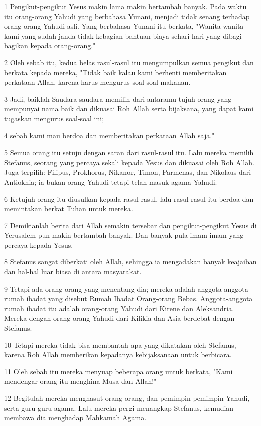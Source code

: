 \par 1 Pengikut-pengikut Yesus makin lama makin bertambah banyak. Pada waktu itu orang-orang Yahudi yang berbahasa Yunani, menjadi tidak senang terhadap orang-orang Yahudi asli. Yang berbahasa Yunani itu berkata, "Wanita-wanita kami yang sudah janda tidak kebagian bantuan biaya sehari-hari yang dibagi-bagikan kepada orang-orang."
\par 2 Oleh sebab itu, kedua belas rasul-rasul itu mengumpulkan semua pengikut dan berkata kepada mereka, "Tidak baik kalau kami berhenti memberitakan perkataan Allah, karena harus mengurus soal-soal makanan.
\par 3 Jadi, baiklah Saudara-saudara memilih dari antaramu tujuh orang yang mempunyai nama baik dan dikuasai Roh Allah serta bijaksana, yang dapat kami tugaskan mengurus soal-soal ini;
\par 4 sebab kami mau berdoa dan memberitakan perkataan Allah saja."
\par 5 Semua orang itu setuju dengan saran dari rasul-rasul itu. Lalu mereka memilih Stefanus, seorang yang percaya sekali kepada Yesus dan dikuasai oleh Roh Allah. Juga terpilih: Filipus, Prokhorus, Nikanor, Timon, Parmenas, dan Nikolaus dari Antiokhia; ia bukan orang Yahudi tetapi telah masuk agama Yahudi.
\par 6 Ketujuh orang itu diusulkan kepada rasul-rasul, lalu rasul-rasul itu berdoa dan memintakan berkat Tuhan untuk mereka.
\par 7 Demikianlah berita dari Allah semakin tersebar dan pengikut-pengikut Yesus di Yerusalem pun makin bertambah banyak. Dan banyak pula imam-imam yang percaya kepada Yesus.
\par 8 Stefanus sangat diberkati oleh Allah, sehingga ia mengadakan banyak keajaiban dan hal-hal luar biasa di antara masyarakat.
\par 9 Tetapi ada orang-orang yang menentang dia; mereka adalah anggota-anggota rumah ibadat yang disebut Rumah Ibadat Orang-orang Bebas. Anggota-anggota rumah ibadat itu adalah orang-orang Yahudi dari Kirene dan Aleksandria. Mereka dengan orang-orang Yahudi dari Kilikia dan Asia berdebat dengan Stefanus.
\par 10 Tetapi mereka tidak bisa membantah apa yang dikatakan oleh Stefanus, karena Roh Allah memberikan kepadanya kebijaksanaan untuk berbicara.
\par 11 Oleh sebab itu mereka menyuap beberapa orang untuk berkata, "Kami mendengar orang itu menghina Musa dan Allah!"
\par 12 Begitulah mereka menghasut orang-orang, dan pemimpin-pemimpin Yahudi, serta guru-guru agama. Lalu mereka pergi menangkap Stefanus, kemudian membawa dia menghadap Mahkamah Agama.
